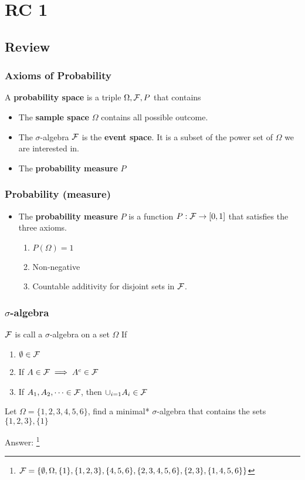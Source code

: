 \chapter{RC 1}

\section{Review}
\subsection{Axioms of Probability}
A \textbf{probability space} is a triple \(\Omega,\mathcal{\MakeUppercase{f}},P\) that contains  
\begin{itemize}
	\item The \textbf{sample space} \(\Omega \) contains all possible outcome.  
	\item The \(\sigma\)-algebra \(\mathcal{\MakeUppercase{f}} \) is the \textbf{event space}. It is a subset of the power set of \(\Omega \) we are interested in. 
	\item The \textbf{probability measure} \(P\)
	
\end{itemize}
\subsection{Probability (measure)}
\begin{itemize}
    \item The \textbf{probability measure} \(P\) is a function \(P:\mathcal{\MakeUppercase{f}} \to [0,1] \) that satisfies the three axioms. 
	\begin{enumerate}
		\item \(P(\Omega ) = 1\) 
		\item Non-negative
		\item Countable additivity for disjoint sets in \(\mathcal{\MakeUppercase{f}} \).  
	\end{enumerate}
\end{itemize}
\subsection{\(\sigma\)-algebra }
\(\mathcal{\MakeUppercase{f}} \) is call a \(\sigma\)-algebra on a set \(\Omega \) If    
\begin{enumerate}
    \item \(\emptyset \in \mathcal{\MakeUppercase{f}} \)
    \item If \(A \in \mathcal{\MakeUppercase{f}} \implies A^c \in \mathcal{\MakeUppercase{f}} \) 
    \item If \(A_1, A_2, \dots \in \mathcal{\MakeUppercase{f}} \), then \(\cup_{i = 1} A_i \in \mathcal{\MakeUppercase{f}}\) 
\end{enumerate}
\begin{eg}
    Let \(\Omega  = \{1,2,3,4,5,6\}\), find a minimal* \(\sigma\)-algebra that contains the sets \(\{1,2,3\},\{1\}\)  
\end{eg}
    Answer: \footnote[1]{\(\mathcal{\MakeUppercase{F}} =  \{\emptyset,\Omega ,\{1\},\{1,2,3\},\{4,5,6\},\{2,3,4,5,6\},\{2,3\},\{1,4,5,6\}\}\) }

